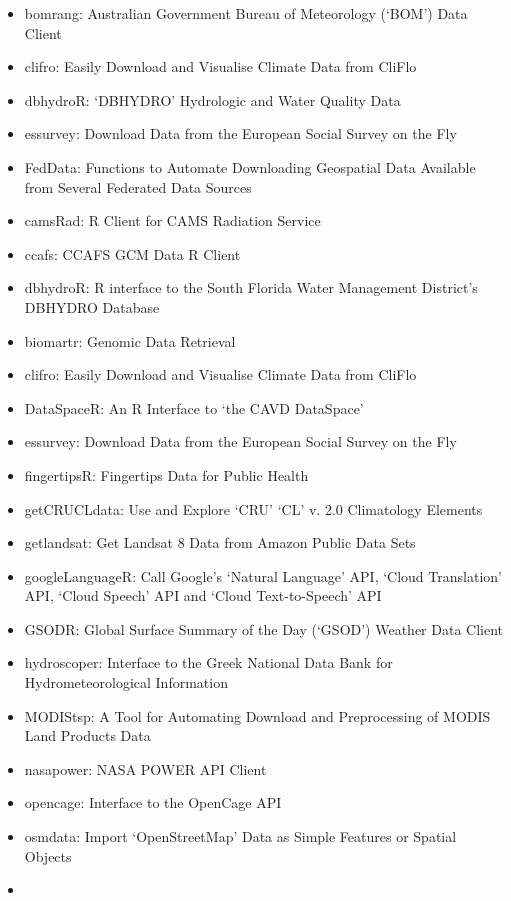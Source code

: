 \documentclass[]{tufte-book}
\providecommand{\tightlist}{%
  \setlength{\itemsep}{0pt}\setlength{\parskip}{0pt}}
\begin{document}
\begin{itemize}
\tightlist
\item
  bomrang: Australian Government Bureau of Meteorology (`BOM') Data Client
\item
  clifro: Easily Download and Visualise Climate Data from CliFlo
\item
  dbhydroR: `DBHYDRO' Hydrologic and Water Quality Data
\item
  essurvey: Download Data from the European Social Survey on the Fly
\item
  FedData: Functions to Automate Downloading Geospatial Data Available from Several Federated Data Sources
\item
  camsRad: R Client for CAMS Radiation Service
\item
  ccafs: CCAFS GCM Data R Client
\item
  dbhydroR: R interface to the South Florida Water Management District's DBHYDRO Database
\item
  biomartr: Genomic Data Retrieval
\item
  clifro: Easily Download and Visualise Climate Data from CliFlo
\item
  DataSpaceR: An R Interface to `the CAVD DataSpace'
\item
  essurvey: Download Data from the European Social Survey on the Fly
\item
  fingertipsR: Fingertips Data for Public Health
\item
  getCRUCLdata: Use and Explore `CRU' `CL' v. 2.0 Climatology Elements
\item
  getlandsat: Get Landsat 8 Data from Amazon Public Data Sets
\item
  googleLanguageR: Call Google's `Natural Language' API, `Cloud Translation' API, `Cloud Speech'
  API and `Cloud Text-to-Speech' API
\item
  GSODR: Global Surface Summary of the Day (`GSOD') Weather Data Client
\item
  hydroscoper: Interface to the Greek National Data Bank for Hydrometeorological Information
\item
  MODIStsp: A Tool for Automating Download and Preprocessing of MODIS Land Products Data
\item
  nasapower: NASA POWER API Client
\item
  opencage: Interface to the OpenCage API
\item
  osmdata: Import `OpenStreetMap' Data as Simple Features or Spatial Objects
\item

\end{itemize}
\end{document}
